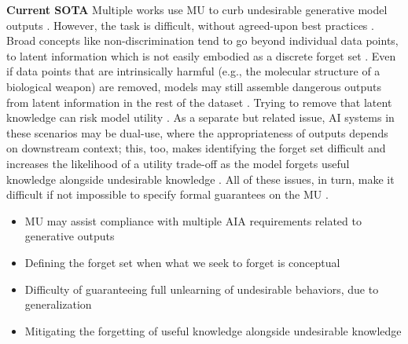 \textbf{Current SOTA}
Multiple works use MU to curb undesirable generative model outputs  \cite{omkar, yu-etal-2023-unlearning, WEI2025104103, fore2024unlearningclimatemisinformationlarge}. However, the task is difficult, without agreed-upon best practices \citep{cooper2024machineunlearningdoesntthink}. Broad concepts like non-discrimination tend to go beyond individual data points, to latent information which is not easily embodied as a discrete forget set \cite{cooper2024machineunlearningdoesntthink, liu_unlearning_2023}. Even if data points that are intrinsically harmful (e.g., the molecular structure of a biological weapon) are removed, models may still assemble dangerous outputs from latent information in the rest of the dataset \citep{cooper2024machineunlearningdoesntthink, intl_ai_safety_2025}. Trying to remove that latent knowledge can risk model utility \cite{cooper2024machineunlearningdoesntthink}. As a separate but related issue, AI systems in these scenarios may be dual-use, where the appropriateness of outputs depends on downstream context; this, too, makes identifying the forget set difficult and increases the likelihood of a utility trade-off as the model forgets useful knowledge alongside undesirable knowledge \cite{cooper2024machineunlearningdoesntthink, shi2024musemachineunlearningsixway, reuel2024openproblemstechnicalai}. All of these issues, in turn, make it difficult if not impossible to specify formal guarantees on the MU \citep{liu_unlearning_2023}. 

\begin{tcolorbox}[colback=green!10,colframe=black!50,title=Key Points]
\begin{itemize}[leftmargin=0pt]
    \item MU may assist compliance with multiple AIA requirements related to generative outputs
\end{itemize}
\end{tcolorbox}

\begin{tcolorbox}[colback=red!10,colframe=black!50,title=Open Problems]
\begin{itemize}[leftmargin=0pt]
    \item Defining the forget set when what we seek to forget is conceptual  
    \item Difficulty of guaranteeing full unlearning of undesirable behaviors, due to generalization
            \item Mitigating the forgetting of useful knowledge alongside undesirable knowledge 
\end{itemize}
\end{tcolorbox}

